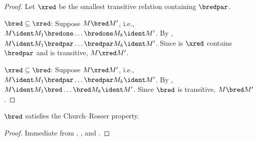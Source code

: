 \documentclass[../../../include/open-logic-section]{subfiles}
\begin{document}
\begin{proof}
  Let $\xred$ be the smallest transitive relation containing
  $\bredpar$.

  $\bred \subseteq \xred$: Suppose $M \bred M'$, i.e., $M \ident M_1
  \bredone \dots \bredone M_k \ident M'$. By , $M
  \ident M_1 \bredpar \dots \bredpar M_k \ident M'$. Since is $\xred$
  contains $\bredpar$ and is transitive, $M \xred M'$.

  $\xred \subseteq \bred$: Suppose $M \xred M'$, i.e., $M
  \ident M_1 \bredpar \dots \bredpar M_k \ident M'$. By , $M \ident M_1
  \bred \dots \bred M_k \ident M'$. Since $\bred$ is transitive, $M
  \bred M'$.
\end{proof}

\begin{thm}
  $\bred$ satisfies the Church--Rosser property.
\end{thm}

\begin{proof}
  Immediate from , , and .
\end{proof}
\end{document}

